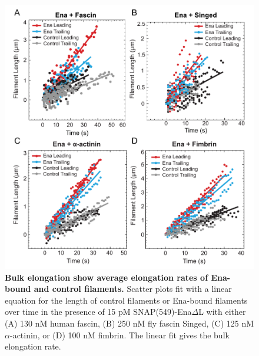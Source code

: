 \begin{figure}
\centering
\includegraphics[width=14cm]{img/ch02/bulk_elongation_thesis.pdf}
\caption[Bulk elongation shows average elongation rates of Ena-bound and control filaments.]{\textbf{Bulk elongation show average elongation rates of Ena-bound and control filaments.} Scatter plots fit with a linear equation for the length of control filaments or Ena-bound filaments over time in the presence of 15 pM SNAP(549)-Ena$\Delta$L with either (A) 130 nM human fascin, (B) 250 nM fly fascin Singed, (C) 125 nM $\alpha$-actinin, or (D) 100 nM fimbrin. The linear fit gives the bulk elongation rate.}
\label{fig:bulk-elongation}
\end{figure}

